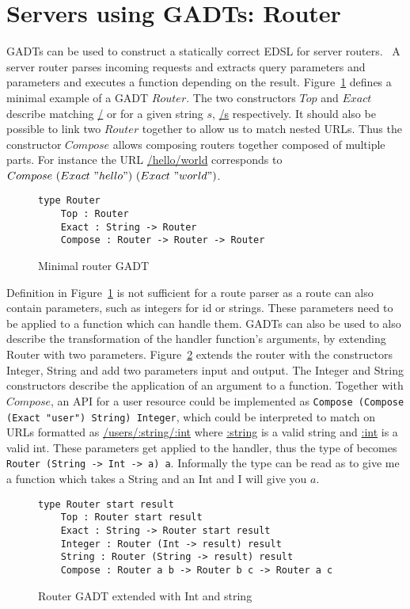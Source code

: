 \section{Servers using GADTs: Router}\label{router}

GADTs can be used to construct a statically correct EDSL for server
routers.~\cite{evanrouter} A server router parses incoming requests and
extracts query parameters and parameters and executes a function depending on
the result. Figure~\ref{routergadtminimal} defines a minimal example of a GADT
$Router$.  The two constructors $Top$ and $Exact$ describe matching \url{/} or
for a given string $s$, \url{/s} respectively. It should also be possible to
link two $Router$ together to allow us to match nested URLs. Thus the
constructor $Compose$ allows composing routers together composed of multiple
parts.  For instance the URL \url{/hello/world} corresponds to $Compose\
(Exact\ "hello")\ (Exact\ "world")$.

\begin{figure}[H]
    \begin{lstlisting}
type Router 
    Top : Router 
    Exact : String -> Router 
    Compose : Router -> Router -> Router
    \end{lstlisting}
    \caption{Minimal router GADT}
    \label{routergadtminimal}
\end{figure}


Definition in Figure~\ref{routergadtminimal} is not sufficient for a route
parser as a route can also contain parameters, such as integers for id or
strings. These parameters need to be applied to a function which can handle
them. GADTs can also be used to also describe the transformation of the handler
function's arguments, by extending Router with two parameters.
Figure~\ref{extendedrouter} extends the router with the constructors Integer,
String and add two parameters input and output. The Integer and String
constructors describe the application of an argument to a function. Together
with $Compose$, an API for a user resource could be implemented as
\texttt{Compose (Compose (Exact "user") String) Integer}, which could be
interpreted to match on URLs formatted as \url{/users/:string/:int} where
\url{:string} is a valid string and \url{:int} is a valid int. These parameters
get applied to the handler, thus the type of becomes \texttt{Router (String ->
Int -> a) a}. Informally the type can be read as to give me a function which
takes a String and an Int and I will give you $a$.

\begin{figure}[H]
    \begin{lstlisting}
type Router start result 
    Top : Router start result
    Exact : String -> Router start result
    Integer : Router (Int -> result) result
    String : Router (String -> result) result
    Compose : Router a b -> Router b c -> Router a c
    \end{lstlisting}
    \caption{Router GADT extended with Int and string}
    \label{extendedrouter}
\end{figure}


